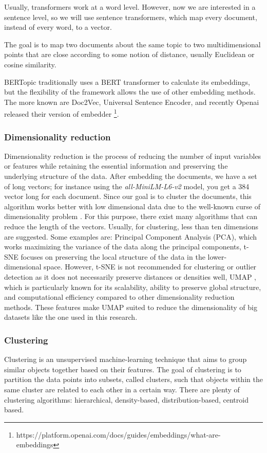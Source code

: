Usually, transformers work at a word level. However, now we are interested in a sentence level, so we will use sentence transformers, which map every document, instead of every word, to a vector.

The goal is to map two documents about the same topic to two multidimensional points that are close according to some notion of distance, usually Euclidean or cosine similarity.

BERTopic traditionally uses a BERT transformer to calculate its embeddings, but the flexibility of the framework allows the use of other embedding methods. The more known are Doc2Vec, Universal Sentence Encoder, and recently Openai released their version of embedder \footnote{https://platform.openai.com/docs/guides/embeddings/what-are-embeddings}.

\subsubsection{Dimensionality reduction}
Dimensionality reduction is the process of reducing the number of input variables or features while retaining the essential information and preserving the underlying structure of the data.
After embedding the documents, we have a set of long vectors; for instance using the \textit{all-MiniLM-L6-v2} model, you get a 384 vector long for each document.
Since our goal is to cluster the documents, this algorithm works better with low dimensional data due to the well-known curse of dimensionality problem \cite{steinbach_dimensionality_2004}. 
For this purpose, there exist many algorithms that can reduce the length of the vectors. Usually, for clustering,  less than ten dimensions are suggested.
Some examples are:
Principal Component Analysis \cite{mackiewicz_principal_1993}(PCA), which works maximizing the variance of the data along the principal components, 
t-SNE \cite{JMLR:v9:vandermaaten08a}focuses on preserving the local structure of the data in the lower-dimensional space. However, t-SNE is not recommended for clustering or outlier detection as it does not necessarily preserve distances or densities well, 
UMAP \cite{McInnes2018}, which is particularly known for its scalability, ability to preserve global structure, and computational efficiency compared to other dimensionality reduction methods. These features make UMAP  suited to reduce the dimensionality of big datasets like the one used in this research.

\subsubsection{Clustering}
Clustering is an unsupervised machine-learning technique that aims to group similar objects together based on their features. The goal of clustering is to partition the data points into subsets, called clusters, such that objects within the same cluster are related to each other in a certain way. There are plenty of clustering algorithms: hierarchical, density-based, distribution-based, centroid based.

